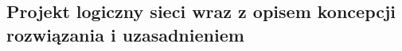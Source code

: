 \documentclass[a4paper,12pt]{extarticle}  %
\begin{document}
\subsection{Projekt logiczny sieci wraz z opisem koncepcji rozwiązania i uzasadnieniem}
\begin{figure}[H]
   \centering
\end{figure}
\cleardoublepage
\end{document}
